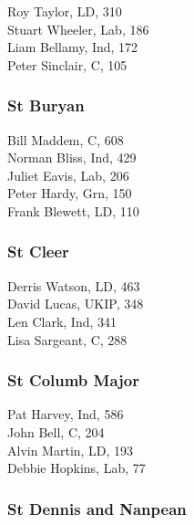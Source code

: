 \documentclass[a4paper,openany,10pt]{book}
\begin{document}


Roy Taylor, LD, 310\\
Stuart Wheeler, Lab, 186\\
Liam Bellamy, Ind, 172\\
Peter Sinclair, C, 105\\


\subsubsection*{St Buryan}



Bill Maddem, C, 608\\
Norman Bliss, Ind, 429\\
Juliet Eavis, Lab, 206\\
Peter Hardy, Grn, 150\\
Frank Blewett, LD, 110\\


\subsubsection*{St Cleer}



Derris Watson, LD, 463\\
David Lucas, UKIP, 348\\
Len Clark, Ind, 341\\
Lisa Sargeant, C, 288\\


\subsubsection*{St Columb Major}



Pat Harvey, Ind, 586\\
John Bell, C, 204\\
Alvin Martin, LD, 193\\
Debbie Hopkins, Lab, 77\\


\subsubsection*{St Dennis and Nanpean}
\end{document}
